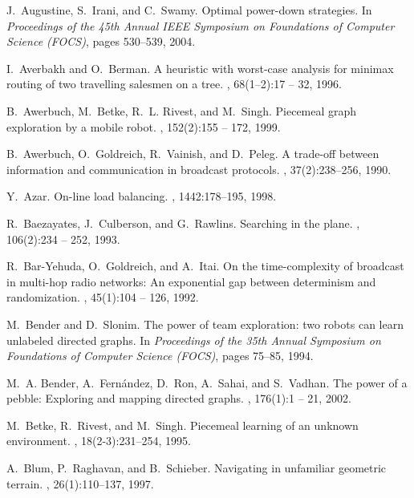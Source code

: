 \documentclass{article}
\begin{document}
\begin{thebibliography}{10}
J.~Augustine, S.~Irani, and C.~Swamy.
\newblock Optimal power-down strategies.
\newblock In {\em Proceedings of the 45th
  Annual IEEE Symposium on Foundations of Computer Science (FOCS)}, pages 530--539, 2004.

I.~Averbakh and O.~Berman.
\newblock A heuristic with worst-case analysis for minimax routing of two
  travelling salesmen on a tree.
, 68(1–2):17 -- 32, 1996.

B.~Awerbuch, M.~Betke, R.~L. Rivest, and M.~Singh.
\newblock Piecemeal graph exploration by a mobile robot.
, 152(2):155 -- 172, 1999.

B.~Awerbuch, O.~Goldreich, R.~Vainish, and D.~Peleg.
\newblock A trade-off between information and communication in broadcast
  protocols.
, 37(2):238--256, 1990.

Y.~Azar.
\newblock On-line load balancing.
, 1442:178--195, 1998.

R.~Baezayates, J.~Culberson, and G.~Rawlins.
\newblock Searching in the plane.
, 106(2):234 -- 252, 1993.

R.~Bar-Yehuda, O.~Goldreich, and A.~Itai.
\newblock On the time-complexity of broadcast in multi-hop radio networks: An
  exponential gap between determinism and randomization.
, 45(1):104 -- 126,
  1992.

M.~Bender and D.~Slonim.
\newblock The power of team exploration: two robots can learn unlabeled
  directed graphs.
\newblock In {\em Proceedings of the 35th
  Annual Symposium on Foundations of Computer Science (FOCS)}, pages 75--85, 1994.

M.~A. Bender, A.~Fernández, D.~Ron, A.~Sahai, and S.~Vadhan.
\newblock The power of a pebble: Exploring and mapping directed graphs.
, 176(1):1 -- 21, 2002.

M.~Betke, R.~Rivest, and M.~Singh.
\newblock Piecemeal learning of an unknown environment.
, 18(2-3):231--254, 1995.

A.~Blum, P.~Raghavan, and B.~Schieber.
\newblock Navigating in unfamiliar geometric terrain.
, 26(1):110--137, 1997.


\end{thebibliography}
\end{document}
